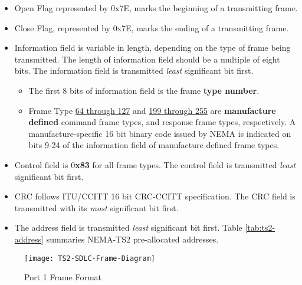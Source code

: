 \documentclass[]{article}
\begin{document}
\begin{itemize}
	\item Open Flag represented by 0x7E, marks the beginning of a transmitting frame.
	\item Close Flag, represented by 0x7E, marks the ending of a transmitting frame.
	\item Information field is variable in length, depending on the type of frame being transmitted. The length of information field should be a multiple of eight bits. The information field is transmitted \textit{least} significant bit first. 
	\begin{itemize}		
	\item The first 8 bits of information field is the frame \textbf{type number}. 
	\item Frame Type \underline{64 through 127} and \underline{199 through 255} are \textbf{manufacture defined} command frame types, and response frame types, respectively. A manufacture-specific 16 bit binary code issued by NEMA is indicated on bits 9-24 of the information field of manufacture defined frame types.
	\end{itemize}
	\item Control field is 0\textbf{x83} for all frame types. The control field is transmitted \textit{least} significant bit first.
	\item CRC follows ITU/CCITT 16 bit CRC-CCITT specification. The CRC field is transmitted with its \textit{most} significant bit first.
	\item The address field is transmitted \textit{least} significant bit first. Table \ref{tab:ts2-address} summaries NEMA-TS2 pre-allocated addresses.
\end{itemize}

\begin{landscape}
	\begin{figure}[p]  %
		\centering
		\texttt{[image: TS2-SDLC-Frame-Diagram]}
		\caption{Port 1 Frame Format}
		\label{fig:port1-frame-format}
	\end{figure}
\end{landscape}
\clearpage
\end{document}
